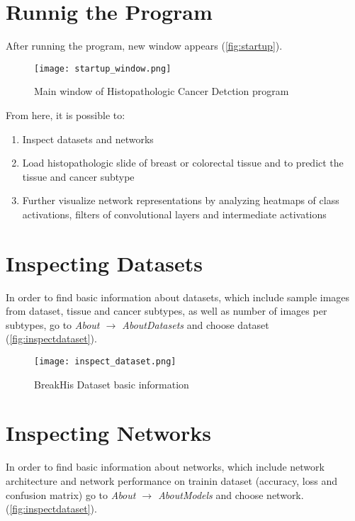 \section{Runnig the Program}

After running the program, new window appears (\textcolor{red}{\autoref{fig:startup}}).

\begin{figure}[h]
	\centering
	\texttt{[image: startup\_window.png]}
	\caption{Main window of Histopathologic Cancer Detction program}
	\label{fig:startup}
\end{figure}

From here, it is possible to:
\begin{enumerate}
	\itemsep 0em
	\item Inspect datasets and networks
	\item Load histopathologic slide of breast or colorectal tissue and to predict the tissue and cancer subtype
	\item Further visualize network representations by analyzing heatmaps of class activations, filters of convolutional layers and intermediate activations
\end{enumerate}

\section{Inspecting Datasets}

In order to find basic information about datasets, which include sample images from dataset, tissue and cancer subtypes, as well as number of images per subtypes, go to \emph{About $\rightarrow$ About\;Datasets} and choose dataset (\textcolor{red}{\autoref{fig:inspectdataset}}).
\clearpage

\begin{figure}[h]
	\centering
	\texttt{[image: inspect\_dataset.png]}
	\caption{BreakHis Dataset basic information}
	\label{fig:inspectdataset}
\end{figure}

\section{Inspecting Networks}

In order to find basic information about networks, which include network architecture and network performance on trainin dataset (accuracy, loss and confusion matrix) go to \emph{About $\rightarrow$ About\;Models} and choose network. (\textcolor{red}{\autoref{fig:inspectdataset}}).

